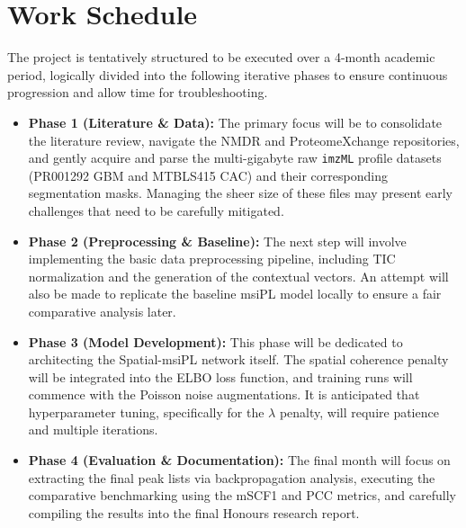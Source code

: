 \documentclass[
12pt, %
oneside, %
english, %
onehalfspacing, %
nolistspacing, %
headsepline, %
]{MastersDoctoralThesis} %
\begin{document}


\chapter{Work Schedule}

The project is tentatively structured to be executed over a 4-month academic period, logically divided into the following iterative phases to ensure continuous progression and allow time for troubleshooting.

\begin{itemize}
    \item \textbf{Phase 1 (Literature \& Data):} The primary focus will be to consolidate the literature review, navigate the NMDR and ProteomeXchange repositories, and gently acquire and parse the multi-gigabyte raw \texttt{imzML} profile datasets (PR001292 GBM and MTBLS415 CAC) and their corresponding segmentation masks. Managing the sheer size of these files may present early challenges that need to be carefully mitigated.
    \item \textbf{Phase 2 (Preprocessing \& Baseline):} The next step will involve implementing the basic data preprocessing pipeline, including TIC normalization and the generation of the contextual vectors. An attempt will also be made to replicate the baseline msiPL model locally to ensure a fair comparative analysis later.
    \item \textbf{Phase 3 (Model Development):} This phase will be dedicated to architecting the Spatial-msiPL network itself. The spatial coherence penalty will be integrated into the ELBO loss function, and training runs will commence with the Poisson noise augmentations. It is anticipated that hyperparameter tuning, specifically for the $\lambda$ penalty, will require patience and multiple iterations.
    \item \textbf{Phase 4 (Evaluation \& Documentation):} The final month will focus on extracting the final peak lists via backpropagation analysis, executing the comparative benchmarking using the mSCF1 and PCC metrics, and carefully compiling the results into the final Honours research report.
\end{itemize}
\end{document}
